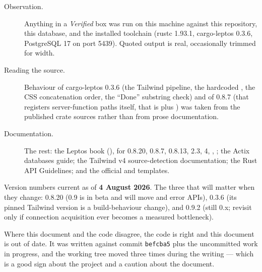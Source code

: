 \begin{description}
  \item[Observation.] Anything in a \emph{Verified} box was run on this machine against this
    repository, this database, and the installed toolchain (rustc 1.93.1, cargo-leptos 0.3.6,
    PostgreSQL 17 on port 5439). Quoted output is real, occasionally trimmed for width.

  \item[Reading the source.] Behaviour of cargo-leptos 0.3.6 (the Tailwind pipeline, the hardcoded
    , the CSS concatenation order, the ``Done'' substring check) and of
     0.8.7 (that  registers server-function paths itself,
    that  is  plus ) was taken from
    the published crate sources rather than from prose documentation.

  \item[Documentation.] The rest: the Leptos book (),  for
     0.8.20,  0.8.7,  0.8.13,  2.3,
     4, , ; the Actix databases guide; the Tailwind v4
    source-detection documentation; the Rust API Guidelines; and the official
     and  templates.
\end{description}

Version numbers current as of \textbf{4 August 2026}. The three that will matter when they change:
 0.8.20 (0.9 is in beta and will move  and error APIs),
 0.3.6 (its pinned Tailwind version is a build-behaviour change), and
 0.9.2 (still 0.x; revisit only if connection acquisition ever becomes a
measured bottleneck).

\begin{keyidea}
Where this document and the code disagree, the code is right and this document is out of date. It
was written against commit \texttt{befcba5} plus the uncommitted work in progress, and the working
tree moved three times during the writing --- which is a good sign about the project and a caution
about the document.
\end{keyidea}
